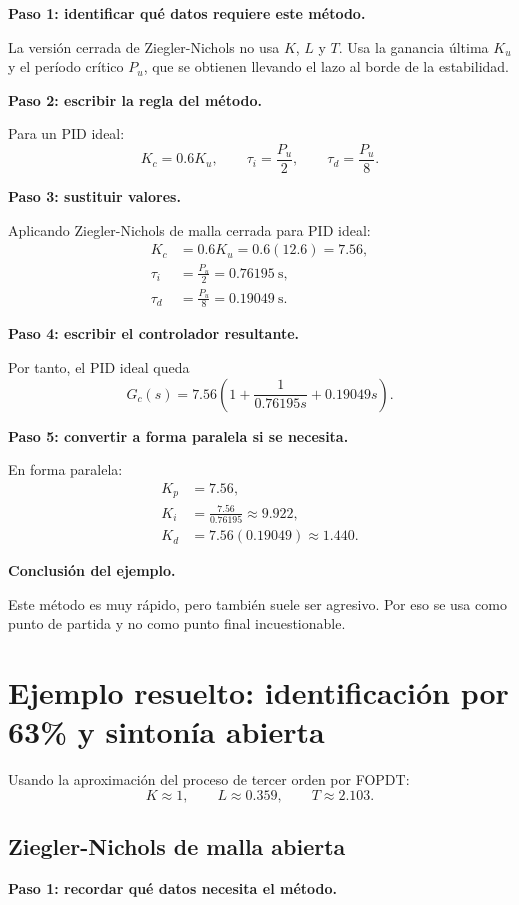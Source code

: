 \documentclass[11pt]{article}
\begin{document}
\textbf{Paso 1: identificar qu\'e datos requiere este m\'etodo.}

La versi\'on cerrada de Ziegler-Nichols no usa $K$, $L$ y $T$. Usa la ganancia \'ultima $K_u$ y el per\'iodo cr\'itico $P_u$, que se obtienen llevando el lazo al borde de la estabilidad.

\textbf{Paso 2: escribir la regla del m\'etodo.}

Para un PID ideal:
\[
K_c=0.6K_u,\qquad \tau_i=\frac{P_u}{2},\qquad \tau_d=\frac{P_u}{8}.
\]

\textbf{Paso 3: sustituir valores.}

Aplicando Ziegler-Nichols de malla cerrada para PID ideal:
\begin{align}
K_c &= 0.6K_u = 0.6(12.6)=7.56,\\
\tau_i &= \frac{P_u}{2}=0.76195~\text{s},\\
\tau_d &= \frac{P_u}{8}=0.19049~\text{s}.
\end{align}

\textbf{Paso 4: escribir el controlador resultante.}

Por tanto, el PID ideal queda
\begin{equation}
G_c(s)=7.56\left(1+\frac{1}{0.76195s}+0.19049s\right).
\end{equation}

\textbf{Paso 5: convertir a forma paralela si se necesita.}

En forma paralela:
\begin{align}
K_p &= 7.56,\\
K_i &= \frac{7.56}{0.76195}\approx 9.922,\\
K_d &= 7.56(0.19049)\approx 1.440.
\end{align}

\textbf{Conclusi\'on del ejemplo.}

Este m\'etodo es muy r\'apido, pero tambi\'en suele ser agresivo. Por eso se usa como punto de partida y no como punto final incuestionable.

\section{Ejemplo resuelto: identificaci\'on por 63\% y sinton\'ia abierta}
Usando la aproximaci\'on del proceso de tercer orden por FOPDT:
\[
K\approx 1,\qquad L\approx 0.359,\qquad T\approx 2.103.
\]

\subsection{Ziegler-Nichols de malla abierta}
\textbf{Paso 1: recordar qu\'e datos necesita el m\'etodo.}
\end{document}

